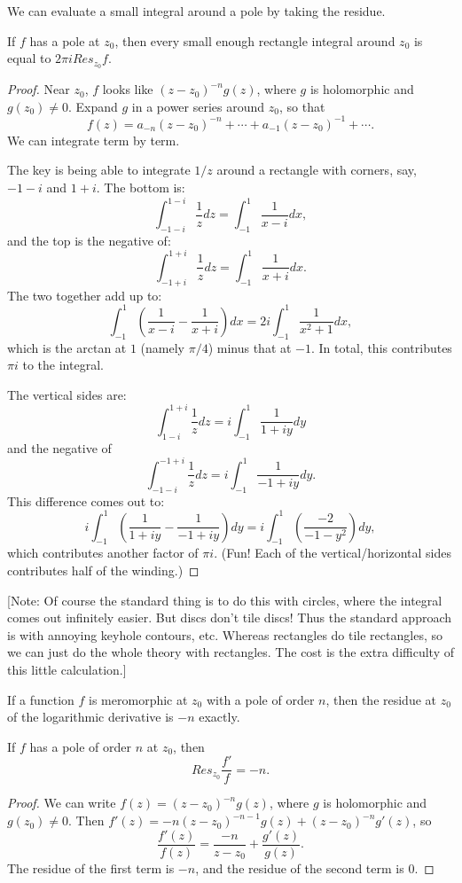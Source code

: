 We can evaluate a small integral around a pole by taking the residue.
\begin{theorem}\label{ResidueTheoremOnRectangle}
If $f$ has a pole at $z_0$, then every small enough rectangle integral around $z_0$ is equal to $2\pi i Res_{z_0} f$.
\end{theorem}



\begin{proof}
Near $z_0$, $f$ looks like $(z-z_0)^{-n} g(z)$, where $g$ is holomorphic and $g(z_0) \neq 0$.
Expand $g$ in a power series around $z_0$, so that
$$
f(z) = a_{-n}(z-z_0)^{-n} + \cdots + a_{-1}(z-z_0)^{-1} + \cdots.
$$
We can integrate term by term.

The key is being able to integrate $1/z$ around a rectangle with corners, say, $-1-i$ and $1+i$. The bottom is:
$$
\int_{-1-i}^{1-i} \frac1z dz
=
\int_{-1}^1 \frac1{x-i} dx,
$$
and the top is the negative of:
$$
\int_{-1+i}^{1+i} \frac1z dz
=
\int_{-1}^1 \frac1{x+i} dx.
$$
The two together add up to:
$$
\int_{-1}^1
\left(\frac1{x-i}-\frac1{x+i} \right)dx
=
2i\int_{-1}^1
\frac{1}{x^2+1}dx,
$$
which is the arctan at $1$ (namely $\pi/4$) minus that at $-1$. In total, this contributes $\pi i$ to the integral.

The vertical sides are:
$$
\int_{1-i}^{1+i} \frac1z dz
=
i\int_{-1}^1 \frac1{1+iy} dy
$$
and the negative of
$$
\int_{-1-i}^{-1+i} \frac1z dz
=
i\int_{-1}^1 \frac1{-1+iy} dy.
$$
This difference comes out to:
$$
i\int_{-1}^1 \left(\frac1{1+iy}-\frac1{-1+iy}\right) dy
=
i\int_{-1}^1 \left(\frac{-2}{-1-y^2}\right) dy,
$$
which contributes another factor of $\pi i$. (Fun! Each of the vertical/horizontal sides contributes half of the winding.)
\end{proof}

[Note: Of course the standard thing is to do this with circles, where the integral comes out infinitely easier. But discs don't tile
discs! Thus the standard approach is with annoying keyhole contours, etc. Whereas rectangles do tile rectangles, so we can just do the
whole theory with rectangles. The cost is the extra difficulty of this little calculation.]



If a function $f$ is meromorphic at $z_0$ with a pole of order $n$, then
the residue at $z_0$ of the logarithmic derivative is $-n$ exactly.
\begin{theorem}\label{ResidueOfLogDerivative}
If $f$ has a pole of order $n$ at $z_0$, then
$$
Res_{z_0} \frac{f'}f = -n.
$$
\end{theorem}



\begin{proof}
We can write $f(z) = (z-z_0)^{-n} g(z)$, where $g$ is holomorphic and $g(z_0) \neq 0$.
Then $f'(z) = -n(z-z_0)^{-n-1} g(z) + (z-z_0)^{-n} g'(z)$, so
$$
\frac{f'(z)}{f(z)} = \frac{-n}{z-z_0} + \frac{g'(z)}{g(z)}.
$$
The residue of the first term is $-n$, and the residue of the second term is $0$.
\end{proof}


